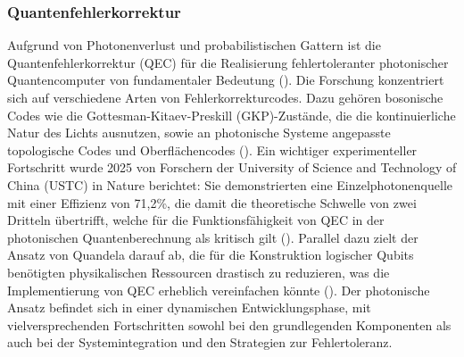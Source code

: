 \subsubsection{Quantenfehlerkorrektur}
Aufgrund von Photonenverlust und probabilistischen Gattern ist die Quantenfehlerkorrektur (QEC) für die Realisierung fehlertoleranter photonischer Quantencomputer von fundamentaler Bedeutung (\cite{swayneChineseScientistsOvercome2025}). Die Forschung konzentriert sich auf verschiedene Arten von Fehlerkorrekturcodes. Dazu gehören bosonische Codes wie die Gottesman-Kitaev-Preskill (GKP)-Zustände, die die kontinuierliche Natur des Lichts ausnutzen, sowie an photonische Systeme angepasste topologische Codes und Oberflächencodes (\cite{LinearOpticsScalable}). 
\newline Ein wichtiger experimenteller Fortschritt wurde 2025 von Forschern der University of Science and Technology of China (USTC) in
Nature berichtet: Sie demonstrierten eine Einzelphotonenquelle mit einer Effizienz von 71,2\%, die damit die theoretische Schwelle von zwei Dritteln übertrifft, welche für die Funktionsfähigkeit von QEC in der photonischen Quantenberechnung als kritisch gilt (\cite{swayneChineseScientistsOvercome2025}). Parallel dazu zielt der Ansatz von Quandela darauf ab, die für die Konstruktion logischer Qubits benötigten physikalischen Ressourcen drastisch zu reduzieren, was die Implementierung von QEC erheblich vereinfachen könnte (\cite{QuandelaAnnounces100000fold2025}).
Der photonische Ansatz befindet sich in einer dynamischen Entwicklungsphase, mit vielversprechenden Fortschritten sowohl bei den grundlegenden Komponenten als auch bei der Systemintegration und den Strategien zur Fehlertoleranz.
